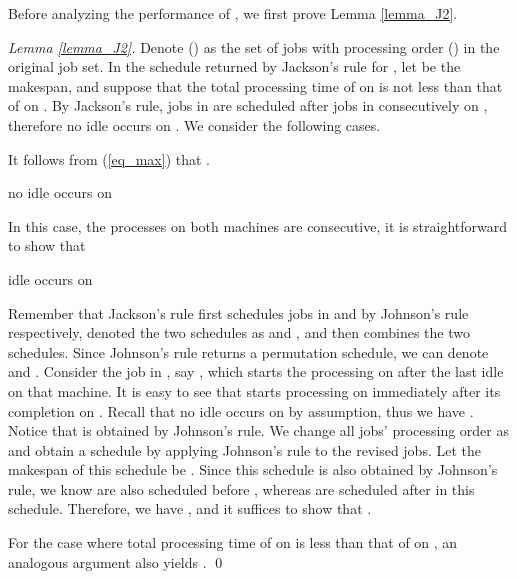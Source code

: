 \documentclass{llncs}
\numberwithin{subcase}{case}
\begin{document}
Before analyzing the performance of , we first prove Lemma \ref{lemma_J2}.
\begin{proof}[Lemma \ref{lemma_J2}]
Denote  () as the set of jobs with processing order  () in the original job set. In the schedule returned by Jackson's rule for , let  be the makespan, and suppose that the total processing time of  on  is not less than that of  on . By  Jackson's rule, jobs in  are scheduled after jobs in  consecutively on , therefore no idle occurs on . We consider the following cases.
\setcounter{case}{0}
\begin{case}

It follows from (\ref{eq_max}) that .
\end{case}

\begin{case}

\begin{subcase}{no idle occurs on }

In this case, the processes on both machines are consecutive, it is straightforward to show that 
\end{subcase}
\begin{subcase}{idle occurs on }

Remember that Jackson's rule first schedules jobs in  and  by Johnson's rule respectively, denoted the two schedules as  and , and then combines the two schedules. Since Johnson's rule returns a permutation schedule, we can denote  and . Consider the job in , say , which starts the processing on  after the last idle on that machine. It is easy to see that  starts processing on  immediately after its completion on . Recall that no idle occurs on  by assumption, thus we have . Notice that  is obtained by Johnson's rule. We change all jobs' processing order as  and obtain a schedule by applying Johnson's rule to the revised jobs. Let the makespan of this schedule be . Since this schedule is also obtained by Johnson's rule, we know  are also scheduled before , whereas  are scheduled after  in this schedule. Therefore, we have , and it suffices to show that .
\end{subcase}
\end{case}

For the case where total processing time of  on  is less than that of  on , an analogous argument also yields .
\qed
\end{proof}
\end{document}
